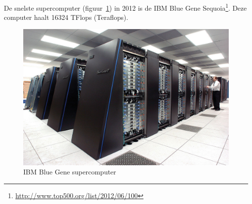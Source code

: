\begin{oef}
De snelste supercomputer (figuur~\ref{fig:ibmBG}) in 2012 is de IBM Blue Gene Sequoia\footnote{\url{http://www.top500.org/list/2012/06/100}}.  Deze computer haalt 16324 TFlops (Teraflops). 
\begin{figure}[hbtp]
\centering
\includegraphics[width=\textwidth]{figuren/eerstegraadsfuncties/IBMBlueGene.jpg}
\caption{IBM Blue Gene supercomputer}
\label{fig:ibmBG}
\end{figure}


\end{oef}
